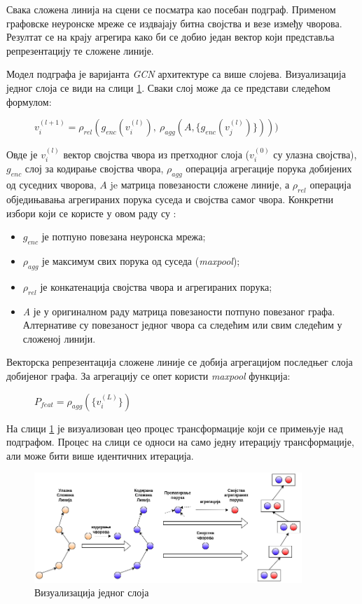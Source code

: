 \documentclass[11pt,oneside]{memoir}
\begin{document}
Свака сложена линија на сцени се посматра као посебан подграф. Применом графовске неуронске мреже
се издвајају битна својства и везе између чворова. Резултат се на крају агрегира како би се добио један вектор који представља репрезентацију те сложене линије.

Модел подграфа је варијанта \textit{GCN} архитектуре \cite{gcn} са више слојева. Визуализација једног слоја се види на слици \ref{vectornet-subgraph}. 
Сваки слој може да се представи следећом формулом:

\begin{figure}[H]
  \centering
  $v^{(l+1)}_{i} = \rho_{rel}(g_{enc}(v^{(l)}_{i}),\ \rho_{agg}(A, \{g_{enc}(v^{(l)}_{j})\})))$
\end{figure}

Овде је $v^{(l)}_{i}$ вектор својства чвора из претходног слоја ($v^{(0)}_{i}$ су улазна својства), $g_{enc}$ слој за кодирање
својства чвора, $\rho_{agg}$ операција агрегације порука добијених од суседних чворова, $A$ je матрица повезаности сложене линије, 
а $\rho_{rel}$ операција обједињавања агрегираних порука суседа и својства самог чвора. Конкретни избори
који се користе у овом раду су \cite{vectornet}:
\begin{itemize}
  \item $g_{enc}$ је потпуно повезана неуронска мрежа;
  \item $\rho_{agg}$ је максимум свих порука од суседа (\textit{maxpool});
  \item $\rho_{rel}$ је конкатенација својства чвора и агрегираних порука;
  \item \textit{A} је у оригиналном раду матрица повезаности потпуно повезаног графа. Алтернативе су повезаност једног чвора са следећим 
  или свим следећим у сложеној линији. 
\end{itemize}

\noindent Векторска репрезентација сложене линије
се добија агрегацијом последњег слоја добијеног графа. За агрегацију се опет користи \textit{maxpool} функција:

\begin{figure}[H]
  \centering
  $P_{feat} = \rho_{agg}(\{v^{(L)}_{i}\})$
\end{figure}

На слици \ref{vectornet-subgraph} је визуализован цео процес трансформације који се примењује над подграфом. Процес на слици се односи на само
једну итерацију трансформације, али може бити више идентичних итерација.

\begin{figure}[H]
  \centering
  \includegraphics[width=0.9\textwidth]{images/vectornet-subgraph-rs.drawio.png}
  \caption{Визуализација једног слоја \label{vectornet-subgraph}}
\end{figure}
\end{document}
